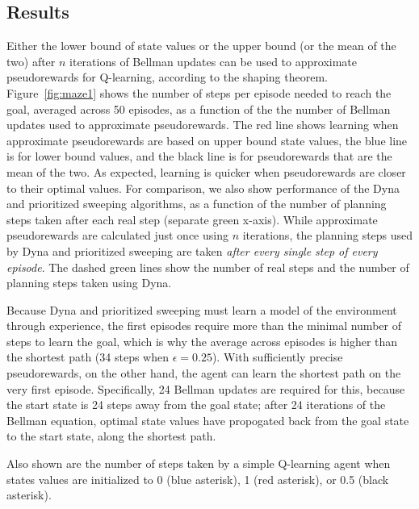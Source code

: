 \documentclass[letterpaper]{article}
\begin{document}
\subsection{Results}

Either the lower bound of state values or the upper bound (or the mean of the two) after $n$ iterations of Bellman updates can be used to approximate pseudorewards for Q-learning, according to the shaping theorem. Figure~\ref{fig:maze1} shows the number of steps per episode needed to reach the goal, averaged across 50 episodes, as a function of the the number of Bellman updates used to approximate pseudorewards. The red line shows learning when approximate pseudorewards are based on upper bound state values, the blue line is for lower bound values, and the black line is for pseudorewards that are the mean of the two. As expected, learning is quicker when pseudorewards are closer to their optimal values. For comparison, we also show performance of the Dyna and prioritized sweeping algorithms, as a function of the number of planning steps taken after each real step (separate green x-axis). While approximate pseudorewards are calculated just once using $n$ iterations, the planning steps used by Dyna and prioritized sweeping are taken \textit{after every single step of every episode}. The dashed green lines show the number of real steps and the number of planning steps taken using Dyna.

Because Dyna and prioritized sweeping must learn a model of the environment through experience, the first episodes require more than the minimal number of steps to learn the goal, which is why the average across episodes is higher than the shortest path (34 steps when $\epsilon=0.25$). With sufficiently precise pseudorewards, on the other hand, the agent can learn the shortest path on the very first episode. Specifically, 24 Bellman updates are required for this, because the start state is 24 steps away from the goal state; after 24 iterations of the Bellman equation, optimal state values have propogated back from the goal state to the start state, along the shortest path.

Also shown are the number of steps taken by a simple Q-learning agent when states values are initialized to 0 (blue asterisk), 1 (red asterisk), or 0.5 (black asterisk).
\end{document}
